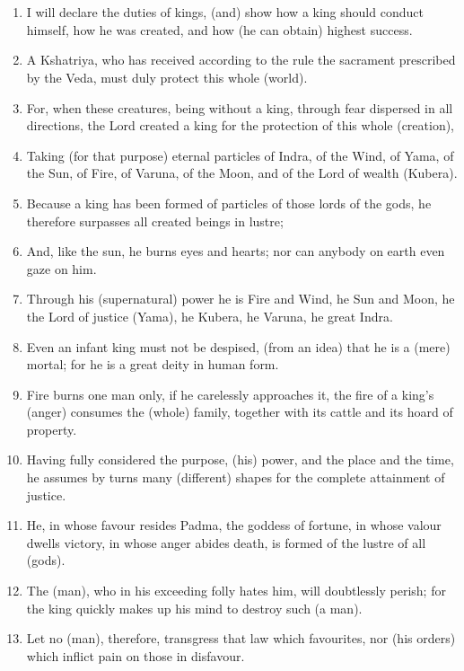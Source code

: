 \chapter{}
\begin{enumerate}
\item I will declare the duties of kings, (and) show how a king should conduct himself, how he was created, and how (he can obtain) highest success.
\item A Kshatriya, who has received according to the rule the sacrament prescribed by the Veda, must duly protect this whole (world).
\item For, when these creatures, being without a king, through fear dispersed in all directions, the Lord created a king for the protection of this whole (creation),
\item Taking (for that purpose) eternal particles of Indra, of the Wind, of Yama, of the Sun, of Fire, of Varuna, of the Moon, and of the Lord of wealth (Kubera).
\item Because a king has been formed of particles of those lords of the gods, he therefore surpasses all created beings in lustre;
\item And, like the sun, he burns eyes and hearts; nor can anybody on earth even gaze on him.
\item Through his (supernatural) power he is Fire and Wind, he Sun and Moon, he the Lord of justice (Yama), he Kubera, he Varuna, he great Indra.
\item Even an infant king must not be despised, (from an idea) that he is a (mere) mortal; for he is a great deity in human form.
\item Fire burns one man only, if he carelessly approaches it, the fire of a king's (anger) consumes the (whole) family, together with its cattle and its hoard of property.
\item Having fully considered the purpose, (his) power, and the place and the time, he assumes by turns many (different) shapes for the complete attainment of justice.
\item He, in whose favour resides Padma, the goddess of fortune, in whose valour dwells victory, in whose anger abides death, is formed of the lustre of all (gods).
\item The (man), who in his exceeding folly hates him, will doubtlessly perish; for the king quickly makes up his mind to destroy such (a man).
\item Let no (man), therefore, transgress that law which favourites, nor (his orders) which inflict pain on those in disfavour.

\end{enumerate}

